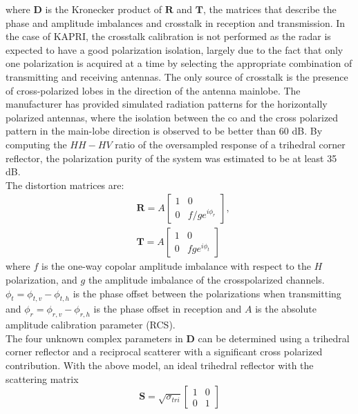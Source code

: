 where $\mathbf{D}$ is the Kronecker product of $\mathbf{R}$ and $\mathbf{T}$, the matrices that describe the phase and amplitude imbalances and crosstalk in reception and transmission.
In the case of KAPRI, the crosstalk calibration is not performed as the radar is expected to have a good polarization isolation, largely due to the fact that only one polarization is acquired at a time by selecting the appropriate combination of transmitting and receiving antennas. The only source of crosstalk is the presence of cross-polarized lobes in the direction of the antenna mainlobe. The manufacturer has provided simulated radiation patterns for the horizontally polarized antennas, where the isolation between the co and the cross polarized pattern in the main-lobe direction is observed to be better than 60 dB. By computing the $HH-HV$ ratio of the oversampled response of a trihedral corner reflector, the polarization purity of the system was estimated to be at least 35 dB.\\
The distortion matrices are:
\begin{equation}
	\begin{aligned}
	&\mathbf{R} = A \begin{bmatrix}
		1 & 0\\
		0 & f/g e^{i\phi_{r}}
	\end{bmatrix},\\
	&\mathbf{T} = A \begin{bmatrix}
			1 & 0\\
			0 & f g e^{i\phi_{t}}
		\end{bmatrix}
	\end{aligned}
\end{equation}
where $f$ is the one-way copolar amplitude imbalance with respect to the $H$ polarization, and $g$ the amplitude imbalance of the crosspolarized channels. $\phi_t = \phi_{t,v} -\phi_{t,h}$ is the phase offset between the polarizations when transmitting and $\phi_{r} = \phi_{r,v} -\phi_{r,h}$ is the phase offset in reception and $A$ is the absolute amplitude calibration parameter (RCS)\cite{Ainsworth2006a, Fore2015}.\\
The four unknown complex parameters in $\mathbf{D}$ can be determined using a trihedral corner reflector and a reciprocal scatterer with a significant cross polarized contribution\cite{Sarabandi1989,Pipia2009}.
With the above model, an ideal trihedral reflector with the scattering matrix
\begin{equation}
 \mathbf{S} = \sqrt{\sigma_{tri}}
 \begin{bmatrix}1 & 0\\ 0 & 1\end{bmatrix}
\end{equation}
